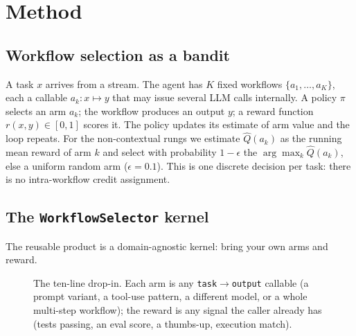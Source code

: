 \documentclass[conference]{IEEEtran}
\newcommand{\code}[1]{\texttt{#1}}
\begin{document}
\section{Method}
\subsection{Workflow selection as a bandit}
A task $x$ arrives from a stream. The agent has $K$ fixed workflows
$\{a_1,\dots,a_K\}$, each a callable $a_k: x \mapsto y$ that may issue several LLM
calls internally. A policy $\pi$ selects an arm $a_k$; the workflow produces an
output $y$; a reward function $r(x,y)\in[0,1]$ scores it. The policy updates its
estimate of arm value and the loop repeats. For the non-contextual rungs we estimate
$\hat{Q}(a_k)$ as the running mean reward of arm $k$ and select with probability
$1-\epsilon$ the $\arg\max_k \hat{Q}(a_k)$, else a uniform random arm
($\epsilon=0.1$). This is one discrete decision per task: there is no intra-workflow
credit assignment.

\subsection{The \code{WorkflowSelector} kernel}
The reusable product is a domain-agnostic kernel: bring your own arms and reward.

\begin{figure}[t]
\centering
{}
\caption{The ten-line drop-in. Each arm is any \code{task}$\rightarrow$\code{output}
callable (a prompt variant, a tool-use pattern, a different model, or a whole
multi-step workflow); the reward is any signal the caller already has (tests
passing, an eval score, a thumbs-up, execution match).}
\label{fig:api}
\end{figure}
\end{document}
